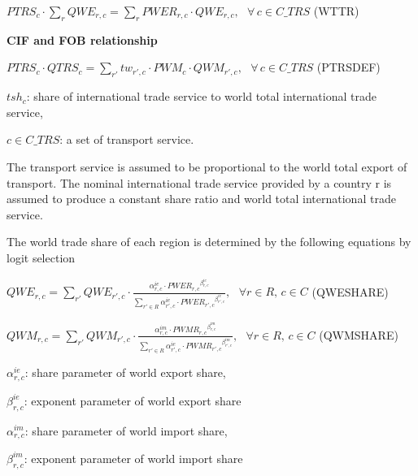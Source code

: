 \documentclass[10pt,a4paper,titlepage,dvipdfmx]{book}
\begin{document}
\begin{center}$PTRS_{c}\cdot \sum _{r}QWE_{r,c}=\sum _{r}PWER_{r,c}\cdot QWE_{r,c},\,\,\,\,\forall \,c\in C\_ TRS$ (WTTR)
\end{center}

\begin{flushleft}\textbf{CIF and FOB relationship}\end{flushleft}


\begin{center}$PTRS_{c}\cdot QTRS_{c}=\sum _{r'}tw_{r',c}\cdot PWM_{c}\cdot QWM_{r',c},\,\,\,\,\forall \,c\in C\_ TRS$ (PTRSDEF)
\end{center}

\begin{flushleft}
$tsh_{c}$: share of international trade service to world total international trade service,

$c\in C\_ TRS$: a set of transport service.
\end{flushleft}

The transport service is assumed to be proportional to the world total export of transport. The nominal international trade service provided by a country r is assumed to produce a constant share ratio and world total international trade service.

The world trade share of each region is determined by the following equations by logit selection


\begin{center}$QWE_{r,c}=\sum _{r'}QWE_{r',c}\cdot \frac{\alpha _{r,c}^{ie}\cdot {PWER_{r,c}}^{\beta _{r,c}^{ie}}}{\sum _{r'\in R}\alpha _{r',c}^{ie}\cdot {PWER_{r',c}}^{\beta _{r',c}^{ie}}},\,\,\,\,\forall r\in R,\,c\in C$ (QWESHARE)
\end{center}


\begin{center}$QWM_{r,c}=\sum _{r'}QWM_{r',c}\cdot \frac{\alpha _{r,c}^{im}\cdot {PWMR_{r,c}}^{\beta _{r,c}^{im}}}{\sum _{r'\in R}\alpha _{r',c}^{ie}\cdot {PWMR_{r',c}}^{\beta _{r',c}^{im}}},\,\,\,\,\forall r\in R,\,c\in C$ (QWMSHARE)
\end{center}

\begin{flushleft}
$\alpha _{r,c}^{ie}$: share parameter of world export share,

$\beta _{r,c}^{ie}$: exponent parameter of world export share

$\alpha _{r,c}^{im}$: share parameter of world import share,

$\beta _{r,c}^{im}$: exponent parameter of world import share
\end{flushleft}
\end{document}
